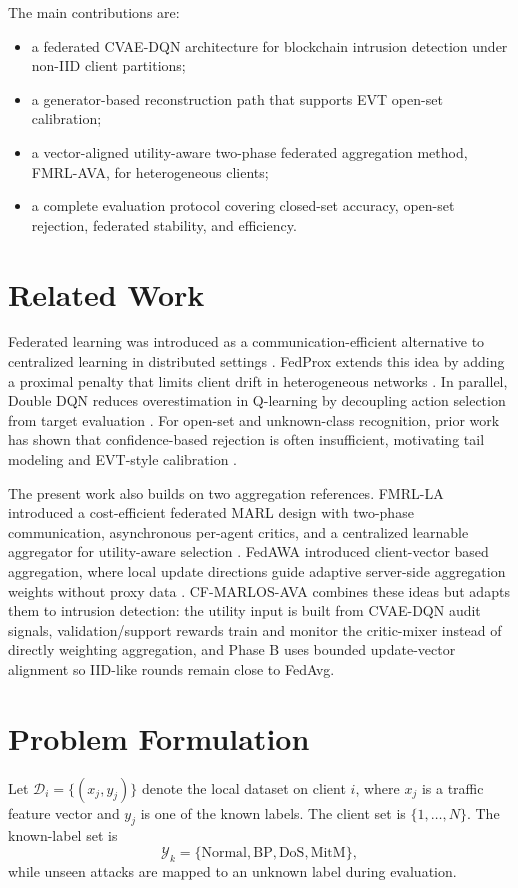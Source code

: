 \documentclass[10pt,twocolumn]{article}
\begin{document}
The main contributions are:
\begin{itemize}[leftmargin=*]
  \item a federated CVAE-DQN architecture for blockchain intrusion detection under non-IID client partitions;
  \item a generator-based reconstruction path that supports EVT open-set calibration;
  \item a vector-aligned utility-aware two-phase federated aggregation method, FMRL-AVA, for heterogeneous clients;
  \item a complete evaluation protocol covering closed-set accuracy, open-set rejection, federated stability, and efficiency.
\end{itemize}

\section{Related Work}
Federated learning was introduced as a communication-efficient alternative to centralized learning in distributed settings \citep{mcmahan2017}. FedProx extends this idea by adding a proximal penalty that limits client drift in heterogeneous networks \citep{li2020}. In parallel, Double DQN reduces overestimation in Q-learning by decoupling action selection from target evaluation \citep{hasselt2016}. For open-set and unknown-class recognition, prior work has shown that confidence-based rejection is often insufficient, motivating tail modeling and EVT-style calibration \citep{bendale2016,rudd2018}.

The present work also builds on two aggregation references. FMRL-LA introduced a cost-efficient federated MARL design with two-phase communication, asynchronous per-agent critics, and a centralized learnable aggregator for utility-aware selection \citep{zhang2024fmrl}. FedAWA introduced client-vector based aggregation, where local update directions guide adaptive server-side aggregation weights without proxy data \citep{shi2025fedawa}. CF-MARLOS-AVA combines these ideas but adapts them to intrusion detection: the utility input is built from CVAE-DQN audit signals, validation/support rewards train and monitor the critic-mixer instead of directly weighting aggregation, and Phase B uses bounded update-vector alignment so IID-like rounds remain close to FedAvg.

\section{Problem Formulation}
Let $\mathcal{D}_i = \{(x_j, y_j)\}$ denote the local dataset on client $i$, where $x_j$ is a traffic feature vector and $y_j$ is one of the known labels. The client set is $\{1,\dots,N\}$. The known-label set is
\[
\mathcal{Y}_k = \{\text{Normal}, \text{BP}, \text{DoS}, \text{MitM}\},
\]
while unseen attacks are mapped to an unknown label during evaluation.
\end{document}
